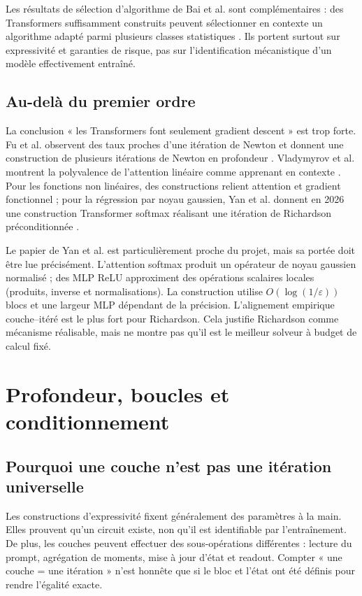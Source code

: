\documentclass[11pt,a4paper]{article}
\begin{document}
Les résultats de sélection d'algorithme de Bai et al. sont complémentaires :
des Transformers suffisamment construits peuvent sélectionner en contexte un
algorithme adapté parmi plusieurs classes statistiques
\cite{bai2023statisticians}. Ils portent surtout sur expressivité et garanties
de risque, pas sur l'identification mécanistique d'un modèle effectivement
entraîné.

\subsection{Au-delà du premier ordre}

La conclusion « les Transformers font seulement gradient descent » est trop
forte. Fu et al. observent des taux proches d'une itération de Newton et donnent
une construction de plusieurs itérations de Newton en profondeur
\cite{fu2024secondorder}. Vladymyrov et al. montrent la polyvalence de
l'attention linéaire comme apprenant en contexte \cite{vladymyrov2024}. Pour
les fonctions non linéaires, des constructions relient attention et gradient
fonctionnel \cite{cheng2024functional}; pour la régression par noyau gaussien,
Yan et al. donnent en 2026 une construction Transformer softmax réalisant une
itération de Richardson préconditionnée \cite{yan2026richardson}.

Le papier de Yan et al. est particulièrement proche du projet, mais sa portée
doit être lue précisément. L'attention softmax produit un opérateur de noyau
gaussien normalisé ; des MLP ReLU approximent des opérations scalaires locales
(produits, inverse et normalisations). La construction utilise
$O(\log(1/\varepsilon))$ blocs et une largeur MLP dépendant de la précision.
L'alignement empirique couche--itéré est le plus fort pour Richardson. Cela
justifie Richardson comme mécanisme réalisable, mais ne montre pas qu'il est le
meilleur solveur à budget de calcul fixé.

\section{Profondeur, boucles et conditionnement}

\subsection{Pourquoi une couche n'est pas une itération universelle}

Les constructions d'expressivité fixent généralement des paramètres à la main.
Elles prouvent qu'un circuit existe, non qu'il est identifiable par
l'entraînement. De plus, les couches peuvent effectuer des sous-opérations
différentes : lecture du prompt, agrégation de moments, mise à jour d'état et
readout. Compter « une couche = une itération » n'est honnête que si le bloc et
l'état ont été définis pour rendre l'égalité exacte.
\end{document}
